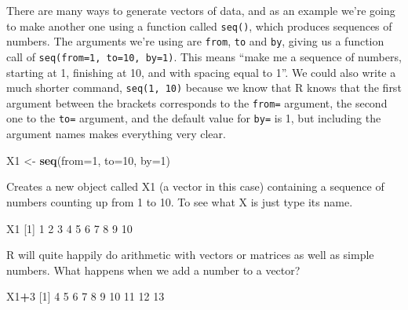 \documentclass[
]{book}
\newenvironment{Shaded}{\begin{snugshade}}{\end{snugshade}}
\newcommand{\DataTypeTok}[1]{\textcolor[rgb]{0.13,0.29,0.53}{#1}}
\newcommand{\DecValTok}[1]{\textcolor[rgb]{0.00,0.00,0.81}{#1}}
\newcommand{\KeywordTok}[1]{\textcolor[rgb]{0.13,0.29,0.53}{\textbf{#1}}}
\newcommand{\NormalTok}[1]{#1}
\newcommand{\OperatorTok}[1]{\textcolor[rgb]{0.81,0.36,0.00}{\textbf{#1}}}
\newcommand{\StringTok}[1]{\textcolor[rgb]{0.31,0.60,0.02}{#1}}
\begin{document}
There are many ways to generate vectors of data, and as an example we're going to make another one using a function called \texttt{seq()}, which produces sequences of numbers. The arguments we're using are \texttt{from}, \texttt{to} and \texttt{by}, giving us a function call of \texttt{seq(from=1,\ to=10,\ by=1)}. This means ``make me a sequence of numbers, starting at 1, finishing at 10, and with spacing equal to 1''. We could also write a much shorter command, \texttt{seq(1,\ 10)} because we know that R knows that the first argument between the brackets corresponds to the \texttt{from=} argument, the second one to the \texttt{to=} argument, and the default value for \texttt{by=} is 1, but including the argument names makes everything very clear.

\begin{Shaded}
\begin{Highlighting}[]

\NormalTok{X1 <-}\StringTok{ }\KeywordTok{seq}\NormalTok{(}\DataTypeTok{from=}\DecValTok{1}\NormalTok{, }\DataTypeTok{to=}\DecValTok{10}\NormalTok{, }\DataTypeTok{by=}\DecValTok{1}\NormalTok{)}
\end{Highlighting}
\end{Shaded}

Creates a new object called X1 (a vector in this case) containing a sequence of numbers counting up from 1 to 10. To see what X is just type its name.

\begin{Shaded}
\begin{Highlighting}[]
\NormalTok{X1}
\NormalTok{ [}\DecValTok{1}\NormalTok{]  }\DecValTok{1}  \DecValTok{2}  \DecValTok{3}  \DecValTok{4}  \DecValTok{5}  \DecValTok{6}  \DecValTok{7}  \DecValTok{8}  \DecValTok{9} \DecValTok{10}
\end{Highlighting}
\end{Shaded}

R will quite happily do arithmetic with vectors or matrices as well as simple numbers. What happens when we add a number to a vector?

\begin{Shaded}
\begin{Highlighting}[]
\NormalTok{X1}\OperatorTok{+}\DecValTok{3}
\NormalTok{ [}\DecValTok{1}\NormalTok{]  }\DecValTok{4}  \DecValTok{5}  \DecValTok{6}  \DecValTok{7}  \DecValTok{8}  \DecValTok{9} \DecValTok{10} \DecValTok{11} \DecValTok{12} \DecValTok{13}
\end{Highlighting}
\end{Shaded}
\end{document}
